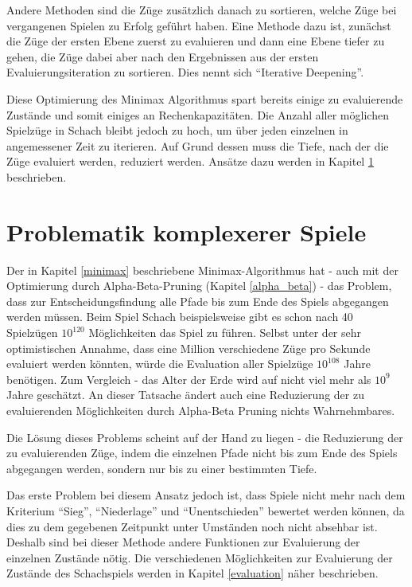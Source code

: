 Andere Methoden sind die Züge zusätzlich danach zu sortieren, welche Züge bei vergangenen Spielen zu Erfolg geführt haben. Eine Methode dazu ist, zunächst die Züge der ersten Ebene zuerst zu evaluieren und dann eine Ebene tiefer zu gehen, die Züge dabei aber nach den Ergebnissen aus der ersten Evaluierungsiteration zu sortieren. Dies nennt sich ``Iterative Deepening''. \cite{Russell2010}

Diese Optimierung des Minimax Algorithmus spart bereits einige zu evaluierende Zustände und somit einiges an Rechenkapazitäten. Die Anzahl aller möglichen Spielzüge in Schach bleibt jedoch zu hoch, um über jeden einzelnen in angemessener Zeit zu iterieren. Auf Grund dessen muss die Tiefe, nach der die Züge evaluiert werden, reduziert werden. Ansätze dazu werden in Kapitel \ref{depth_limit} beschrieben.

\section{Problematik komplexerer Spiele}\label{depth_limit}

Der in Kapitel \ref{minimax} beschriebene Minimax-Algorithmus hat - auch mit der Optimierung durch Alpha-Beta-Pruning (Kapitel \ref{alpha_beta}) - das Problem, dass zur Entscheidungsfindung alle Pfade bis zum Ende des Spiels abgegangen werden müssen. Beim Spiel Schach beispielsweise gibt es schon nach 40 Spielzügen $10^120$ Möglichkeiten das Spiel zu führen. Selbst unter der sehr optimistischen Annahme, dass eine Million verschiedene Züge pro Sekunde evaluiert werden könnten, würde die Evaluation aller Spielzüge $10^108$ Jahre benötigen. \cite{Bernstein1958} Zum Vergleich - das Alter der Erde wird auf nicht viel mehr als $10^9$ Jahre geschätzt. \cite{Braterman} An dieser Tatsache ändert auch eine Reduzierung der zu evaluierenden Möglichkeiten durch Alpha-Beta Pruning nichts Wahrnehmbares.


Die Lösung dieses Problems scheint auf der Hand zu liegen - die Reduzierung der zu evaluierenden Züge, indem die einzelnen Pfade nicht bis zum Ende des Spiels abgegangen werden, sondern nur bis zu einer bestimmten Tiefe.

Das erste Problem bei diesem Ansatz jedoch ist, dass Spiele nicht mehr nach dem Kriterium ``Sieg'', ``Niederlage'' und ``Unentschieden'' bewertet werden können, da dies zu dem gegebenen Zeitpunkt unter Umständen noch nicht absehbar ist. Deshalb sind bei dieser Methode andere Funktionen zur Evaluierung der einzelnen Zustände nötig. Die verschiedenen Möglichkeiten zur Evaluierung der Zustände des Schachspiels werden in Kapitel \ref{evaluation} näher beschrieben.

